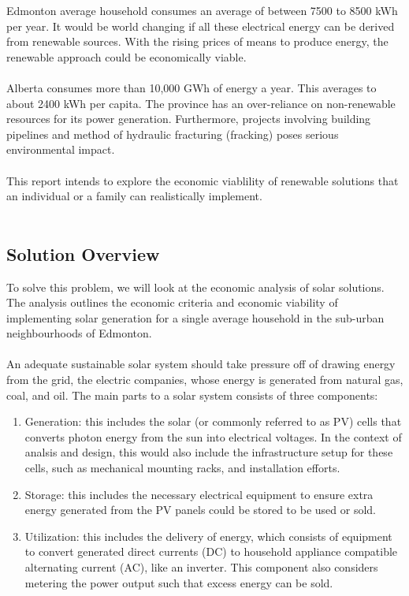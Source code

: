 \documentclass[10pt,letterpaper]{article}
\begin{document}
Edmonton average household consumes an average of between 7500 to 8500 kWh per year. It would be world changing if all these electrical energy can be derived from renewable sources. With the rising prices of means to produce energy, the renewable approach could be economically viable.\\
\\
Alberta consumes more than 10,000 GWh of energy a year. This averages to about 2400 kWh per capita\cite{average-albertan-consumption}. The province has an over-reliance on non-renewable resources for its power generation. Furthermore, projects involving building pipelines and method of hydraulic fracturing (fracking) poses serious environmental impact\cite{fracking-kurzgesagt}.\\
\\
This report intends to explore the economic viablility of renewable solutions that an individual or a family can realistically implement.\\
\\

\subsection{Solution Overview}

To solve this problem, we will look at the economic analysis of solar solutions. The analysis outlines the economic criteria and economic viability of implementing solar generation for a single average household in the sub-urban neighbourhoods of Edmonton.\\
\\
An adequate sustainable solar system should take pressure off of drawing energy from the grid, the electric companies, whose energy is generated from natural gas, coal, and oil. The main parts to a solar system consists of three components\cite{components}:

\begin{enumerate}
	\item Generation: this includes the solar (or commonly referred to as PV) cells that converts photon energy from the sun into electrical voltages. In the context of analsis and design, this would also include the infrastructure setup for these cells, such as mechanical mounting racks, and installation efforts.
	\item Storage: this includes the necessary electrical equipment to ensure extra energy generated from the PV panels could be stored to be used or sold. 
	\item Utilization: this includes the delivery of energy, which consists of equipment to convert generated direct currents (DC) to household appliance compatible alternating current (AC), like an inverter. This component also considers metering the power output such that excess energy can be sold.
\end{enumerate}
\end{document}
